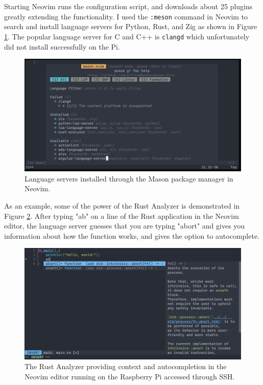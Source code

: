 \documentclass[12pt]{article}
\begin{document}
Starting Neovim runs the configuration script, and downloads about 25 plugins greatly extending the functionality. I used the \verb|:meson| command in Neovim to search and install language servers for Python, Rust, and Zig as shown in Figure \ref{fig:language_servers}. The popular language server for C and C++ is \verb|clangd| which unfortunately did not install successfully on the Pi. 

\begin{figure}[h]
\centering
\includegraphics[width=1.0\textwidth]{language-servers.png} %
\caption{Language servers installed through the Mason package manager in Neovim.}
\label{fig:language_servers}
\end{figure}

As an example, some of the power of the Rust Analyzer is demonstrated in Figure \ref{fig:rust_analyzer}. After typing "ab" on a line of the Rust application in the Neovim editor, the language server guesses that you are typing "abort" and gives you information about how the function works, and gives the option to autocomplete.

\begin{figure}[h]
\centering
\includegraphics[width=1.0\textwidth]{rust-analyzer.png} %
\caption{The Rust Analyzer providing context and autocompletion in the Neovim editor running on the Raspberry Pi accessed through SSH.}
\label{fig:rust_analyzer}
\end{figure}
\end{document}
